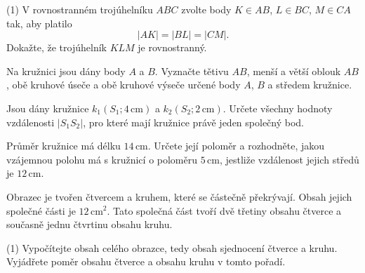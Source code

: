 \documentclass[12pt,a4paper]{article}
\begin{document}
\begin{exercise}

    \begin{tasks}(1)
        \task
        V rovnostranném trojúhelníku $ABC$ zvolte body
        $K\in AB$, $L\in BC$, $M\in CA$ tak, aby platilo
        \[
            |AK|=|BL|=|CM|.
        \]
        Dokažte, že trojúhelník $KLM$ je rovnostranný.

        \task
        Na kružnici jsou dány body $A$ a $B$. Vyznačte tětivu $AB$,
        menší a větší oblouk $AB$, obě kruhové úseče a obě kruhové výseče
        určené body $A$, $B$ a středem kružnice.

        \task
        Jsou dány kružnice $k_1(S_1;4\,\mathrm{cm})$ a
        $k_2(S_2;2\,\mathrm{cm})$. Určete všechny hodnoty vzdálenosti
        $|S_1S_2|$, pro které mají kružnice právě jeden společný bod.

        \task
        Průměr kružnice má délku $14\,\mathrm{cm}$.
        Určete její poloměr a rozhodněte, jakou vzájemnou polohu má s kružnicí
        o poloměru $5\,\mathrm{cm}$, jestliže vzdálenost jejich středů je
        $12\,\mathrm{cm}$.
    \end{tasks}

\end{exercise}



\begin{exercise}

    Obrazec je tvořen čtvercem a kruhem, které se částečně překrývají.
    Obsah jejich společné části je $12\,\mathrm{cm}^2$. Tato společná část tvoří
    dvě třetiny obsahu čtverce a současně jednu čtvrtinu obsahu kruhu.

    \begin{center}
    \end{center}

    \begin{tasks}(1)
        \task Vypočítejte obsah celého obrazce, tedy obsah sjednocení čtverce a kruhu.
        \task Vyjádřete poměr obsahu čtverce a obsahu kruhu v tomto pořadí.
    \end{tasks}

\end{exercise}
\end{document}
